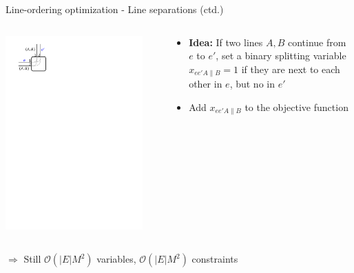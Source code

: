 \documentclass{beamer}
\begin{document}
\begin{frame}{Line-ordering optimization - Line separations (ctd.)}	
	\begin{columns}[T]
		\begin{column}{0.25\textwidth}
			\centering\includegraphics[width=0.9\textwidth, page=3]{figures/crossing.pdf}
		\end{column}
		\begin{column}[T]{0.75\textwidth}			
			\begin{itemize}
				\item \alert{\textbf{Idea:}} If two lines $A, B$ continue from $e$ to $e'$, set a binary splitting variable $x_{ee'A\|B} = 1$ if they are next to each other in $e$, but no in $e'$
				\item Add $x_{ee'A\|B}$ to the objective function
			\end{itemize}
		\end{column}
	\end{columns}

	\vspace{1cm}
	$\Rightarrow$ Still $\mathcal{O}(|E|M^2)$ variables, $\mathcal{O}(|E|M^2)$ constraints
\end{frame}
\end{document}
